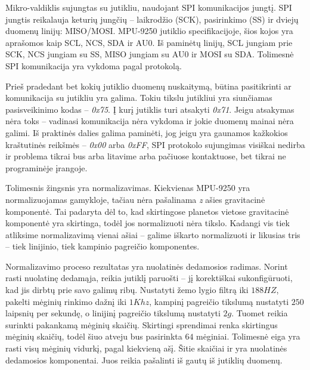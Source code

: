 Mikro-valdiklis sujungtas su jutikliu, naudojant SPI komunikacijos jungtį.
SPI jungtis reikalauja keturių jungčių -- laikrodžio (SCK), pasirinkimo (SS) ir dviejų duomenų linijų: MISO/MOSI.
MPU-9250 jutiklio specifikacijoje, šios kojos yra aprašomos kaip SCL, NCS, SDA ir AU0.
Iš paminėtų linijų, SCL jungiam prie SCK, NCS jungiam su SS, MISO jungiam su AU0 ir MOSI su SDA.
Tolimesnė SPI komunikacija yra vykdoma pagal protokolą.

Prieš pradedant bet kokių jutiklio duomenų nuskaitymą, būtina pasitikrinti ar komunikacija su jutikliu yra galima.
Tokiu tikslu jutikliui yra siunčiamas pasisveikinimo kodas -- \textit{0x75}.
Į kurį jutiklis turi atsakyti \textit{0x71}. 
Jeigu atsakymas nėra toks -- vadinasi komunikacija nėra vykdoma ir jokie duomenų mainai nėra galimi.
Iš praktinės dalies galima paminėti, jog jeigu yra gaunamos kažkokios kraštutinės reikšmės -- \textit{0x00} arba \textit{0xFF}, SPI protokolo sujungimas visiškai nedirba ir problema tikrai bus arba litavime arba pačiuose kontaktuose, bet tikrai ne programinėje įrangoje.

Tolimesnis žingsnis yra normalizavimas. 
Kiekvienas MPU-9250 yra normalizuojamas gamykloje, tačiau nėra pašalinama \textit{z} ašies gravitacinė komponentė.
Tai padaryta dėl to, kad skirtingose planetos vietose gravitacinė komponentė yra skirtinga, todėl jos normalizuoti nėra tikslo.
Kadangi vis tiek atliksime normalizavimą vienai ašiai -- galime iškarto normalizuoti ir likusias tris -- tiek linijinio, tiek kampinio pagreičio komponentes.

Normalizavimo proceso rezultatas yra nuolatinės dedamosios radimas.
Norint rasti nuolatinę dedamąja, reikia jutiklį paruošti -- jį korektiškai sukonfigūruoti, kad jis dirbtų prie savo galimų ribų.
Nustatyti žemo lygio filtrą iki $188 HZ$, pakelti mėginių rinkimo dažnį iki $1Khz$, kampinį pagreičio tikslumą nustatyti $250$ laipsnių per sekundę, o linijinį pagreičio tikslumą nustatyti $2g$.
Tuomet reikia surinkti pakankamą mėginių skaičių.
Skirtingi sprendimai renka skirtingus mėginių skaičių, todėl šiuo atveju bus pasirinkta $64$ mėginiai.
Tolimesnė eiga yra rasti visų mėginių vidurkį, pagal kiekvieną ašį.
Šitie skaičiai ir yra nuolatinės dedamosios komponentai. Juos reikia pašalinti iš gautų iš jutiklių duomenų.


